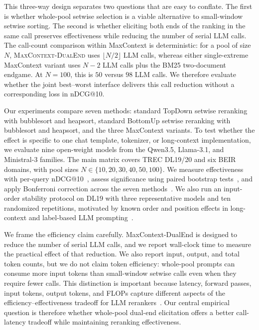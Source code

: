 This three-way design separates two questions that are easy to conflate.
The first is whether whole-pool setwise selection is a viable alternative
to small-window setwise sorting. The second is whether eliciting both
ends of the ranking in the same call preserves effectiveness while
reducing the number of serial LLM calls. The call-count comparison within
MaxContext is deterministic: for a pool of size $N$,
\textsc{MaxContext-DualEnd} uses $\lfloor N/2 \rfloor$ LLM calls,
whereas either single-extreme MaxContext variant uses $N{-}2$ LLM calls
plus the BM25 two-document endgame. At $N{=}100$, this is $50$ versus
$98$ LLM calls. We therefore evaluate whether the joint best--worst
interface delivers this call reduction without a corresponding loss in
nDCG@10.

Our experiments compare seven methods: standard TopDown setwise
reranking with bubblesort and heapsort, standard BottomUp setwise
reranking with bubblesort and heapsort, and the three MaxContext
variants. To test whether the effect is specific to one chat template,
tokenizer, or long-context implementation, we evaluate nine open-weight
models from the Qwen3.5, Llama-3.1, and Ministral-3 families. The main
matrix covers TREC DL19/20 and six BEIR domains, with pool sizes
$N \in \{10,20,30,40,50,100\}$. We measure effectiveness with per-query
nDCG@10~\citep{jarvelin2002cumulated}, assess significance using paired
bootstrap tests~\citep{efron1993bootstrap,smucker2007comparison,
urbano2019significance}, and apply Bonferroni correction across the
seven methods~\citep{bonferroni1936teoria}. We also run an input-order
stability protocol on DL19 with three representative models and ten
randomized repetitions, motivated by known order and position effects in
long-context and label-based LLM prompting~\citep{liu2024lost,
zheng2024mcqbias,shi2025positionbias,pradeep2023rankzephyr}.

We frame the efficiency claim carefully. MaxContext-DualEnd is designed
to reduce the number of serial LLM calls, and we report wall-clock time
to measure the practical effect of that reduction. We also report input,
output, and total token counts, but we do not claim token efficiency:
whole-pool prompts can consume more input tokens than small-window
setwise calls even when they require fewer calls. This distinction is
important because latency, forward passes, input tokens, output tokens,
and FLOPs capture different aspects of the efficiency--effectiveness
tradeoff for LLM rerankers~\citep{peng2025flopsreranking}. Our central
empirical question is therefore whether whole-pool dual-end elicitation
offers a better call-latency tradeoff while maintaining reranking
effectiveness.

